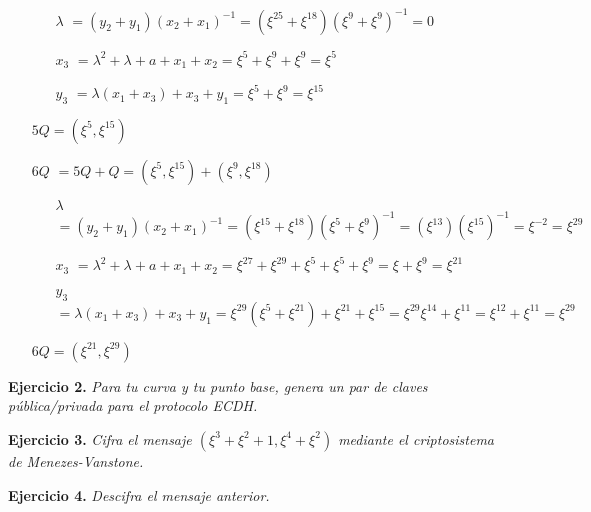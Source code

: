 \documentclass[fleqn]{article}
\begin{document}
\begin{itemize}
            \begin{itemize}
                \item[$\lambda$] $ = (y_2 + y_1)(x_2 + x_1)^{-1} = (\xi^{25} + \xi^{18})(\xi^{9} + \xi^{9})^{-1}  = 0$
                \item[$x_3$] $ = \lambda^2 + \lambda + a + x_1 + x_2 = \xi^{5} + \xi^{9} + \xi^{9} = \xi^{5}$
                \item[$y_3$] $ = \lambda(x_1 + x_3) + x_3 + y_1 = \xi^{5} + \xi^{9} = \xi^{15}$
            \end{itemize}
            $5Q = (\xi^{5}, \xi^{15})$
        \item[$6Q$] $ = 5Q + Q = (\xi^{5}, \xi^{15}) + (\xi^9, \xi^{18})$
            \begin{itemize}
                \item[$\lambda$] $ = (y_2 + y_1)(x_2 + x_1)^{-1} = (\xi^{15} + \xi^{18})(\xi^{5} + \xi^{9})^{-1} = (\xi^{13})(\xi^{15})^{-1} = \xi^{-2} = \xi^{29}$
                \item[$x_3$] $ = \lambda^2 + \lambda + a + x_1 + x_2 = \xi^{27} + \xi^{29} + \xi^{5} + \xi^{5} + \xi^{9} = \xi + \xi^{9} = \xi^{21}$
                \item[$y_3$] $ = \lambda(x_1 + x_3) + x_3 + y_1 = \xi^{29} (\xi^{5} + \xi^{21}) + \xi^{21} + \xi^{15} = \xi^{29} \xi^{14} + \xi^{11} = \xi^{12} + \xi^{11} = \xi^{29}$
            \end{itemize}
            $6Q = (\xi^{21}, \xi^{29})$
    \end{itemize}

    \newpage
    \textbf{Ejercicio 2. }\textit{Para tu curva y tu punto base, genera un par de claves pública/privada para el protocolo ECDH.}
    \vspace{0.5cm}


    \newpage
    \textbf{Ejercicio 3. }\textit{Cifra el mensaje $(\xi^3 + \xi^2 + 1, \xi^4 + \xi^2)$ mediante el criptosistema de Menezes-Vanstone.}
    \vspace{0.5cm}


    \newpage
    \textbf{Ejercicio 4. }\textit{Descifra el mensaje anterior.}
\end{document}
